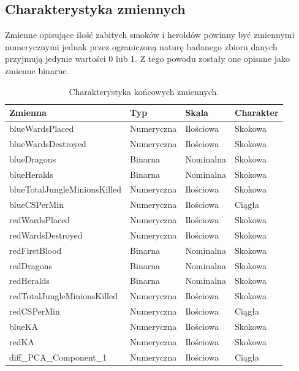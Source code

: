 \documentclass[twoside]{customStyle}
\begin{document}
\subsection{Charakterystyka zmiennych}
Zmienne opisujące ilość zabitych smoków i heroldów powinny być zmiennymi numerycznymi jednak przez ograniczoną naturę badanego zbioru danych przyjmują jedynie wartości 0 lub 1. Z tego powodu zostały one opisane jako zmienne binarne.
\begin{table}[H]
\centering
\begin{tabular}{l l l l}
\toprule
	\textbf{Zmienna} & \textbf{Typ} & \textbf{Skala} & \textbf{Charakter} \\
\midrule
	blueWardsPlaced & Numeryczna & Ilościowa & Skokowa \\
	blueWardsDestroyed & Numeryczna & Ilościowa & Skokowa \\
	blueDragons & Binarna & Nominalna & Skokowa \\
	blueHeralds & Binarna & Nominalna & Skokowa \\
	blueTotalJungleMinionsKilled & Numeryczna & Ilościowa & Skokowa \\
	blueCSPerMin & Numeryczna & Ilościowa & Ciągła \\
	redWardsPlaced & Numeryczna & Ilościowa & Skokowa \\
	redWardsDestroyed & Numeryczna & Ilościowa & Skokowa \\
	redFirstBlood & Binarna & Nominalna & Skokowa \\
	redDragons & Binarna & Nominalna & Skokowa \\
	redHeralds & Binarna & Nominalna & Skokowa \\
	redTotalJungleMinionsKilled & Numeryczna & Ilościowa & Skokowa \\
	redCSPerMin & Numeryczna & Ilościowa & Ciągła \\
	blueKA & Numeryczna & Ilościowa & Skokowa \\
	redKA & Numeryczna & Ilościowa & Skokowa \\
	diff\_PCA\_Component\_1 & Numeryczna & Ilościowa & Ciągła \\
\bottomrule
\end{tabular}
\caption{Charakterystyka końcowych zmiennych.}
\end{table}
\end{document}
